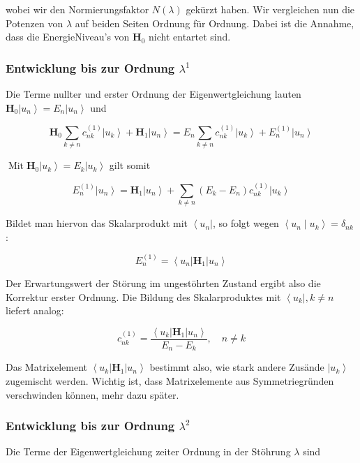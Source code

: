 \documentclass[10pt, letterpaper]{article}
\begin{document}
wobei wir den Normierungsfaktor $N(\lambda)$ gekürzt haben. Wir vergleichen nun die Potenzen von $\lambda$ auf beiden Seiten Ordnung für Ordnung. Dabei ist die Annahme, dass die EnergieNiveau's von $\mathbf{H}_{0}$ nicht entartet sind.

\subsubsection*{Entwicklung bis zur Ordnung $\lambda^{1}$}
Die Terme nullter und erster Ordnung der Eigenwertgleichung lauten $\mathbf{H}_{0}\left|u_{n}\right\rangle=E_{n}\left|u_{n}\right\rangle$ und

$$
\mathbf{H}_{0} \sum_{k \neq n} c_{n k}^{(1)}\left|u_{k}\right\rangle+\mathbf{H}_{1}\left|u_{n}\right\rangle=E_{n} \sum_{k \neq n} c_{n k}^{(1)}\left|u_{k}\right\rangle+E_{n}^{(1)}\left|u_{n}\right\rangle
$$

$\operatorname{Mit} \mathbf{H}_{0}\left|u_{k}\right\rangle=E_{k}\left|u_{k}\right\rangle$ gilt somit

$$
E_{n}^{(1)}\left|u_{n}\right\rangle=\mathbf{H}_{1}\left|u_{n}\right\rangle+\sum_{k \neq n}\left(E_{k}-E_{n}\right) c_{n k}^{(1)}\left|u_{k}\right\rangle
$$

Bildet man hiervon das Skalarprodukt mit $\left\langle u_{n}\right|$, so folgt wegen $\left\langle u_{n} \mid u_{k}\right\rangle=\delta_{n k}$ :

$$
E_{n}^{(1)}=\left\langle u_{n}\right| \mathbf{H}_{1}\left|u_{n}\right\rangle
$$

Der Erwartungswert der Störung im ungestöhrten Zustand ergibt also die Korrektur erster Ordnung. Die Bildung des Skalarproduktes mit $\left\langle u_{k}\right|, k \neq n$ liefert analog:

$$
c_{n k}^{(1)}=\frac{\left\langle u_{k}\right| \mathbf{H}_{1}\left|u_{n}\right\rangle}{E_{n}-E_{k}}, \quad n \neq k
$$

Das Matrixelement $\left\langle u_{k}\right| \mathbf{H}_{1}\left|u_{n}\right\rangle$ bestimmt also, wie stark andere Zusände $\left|u_{k}\right\rangle$ zugemischt werden. Wichtig ist, dass Matrixelemente aus Symmetriegründen verschwinden können, mehr dazu später.

\subsubsection*{Entwicklung bis zur Ordnung $\lambda^{2}$}
Die Terme der Eigenwertgleichung zeiter Ordnung in der Stöhrung $\lambda$ sind
\end{document}
